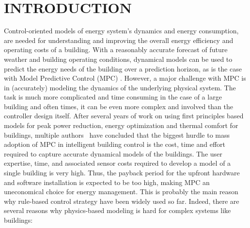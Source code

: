 \section{INTRODUCTION}

\label{S:intro}



\textcolor[rgb]{0,0,1}{Control-oriented models of energy system's dynamics and energy consumption, are needed for understanding and improving the overall energy efficiency and operating costs of a building.
With a reasonably accurate forecast of future weather and building operating conditions, dynamical models can be used to predict the energy needs of the building over a prediction horizon, as is the case with Model Predictive Control (MPC) \cite{Sturzenegger2016}.
However, a major challenge with MPC is in (accurately) modeling the dynamics of the underlying physical system.
The task is much more complicated and time consuming in the case of a large building and often times, it can be even more complex and involved than the controller design itself.
After several years of work on using first principles based models for peak power reduction, energy optimization and thermal comfort for buildings, multiple authors~\cite{Sturzenegger2016, vzavcekova2014} have concluded that the biggest hurdle to mass adoption of MPC in intelligent building control is the cost, time and effort required to capture accurate dynamical models of the buildings.
The user expertise, time, and associated sensor costs required to develop a model of a single building is very high. Thus, the payback period for the upfront hardware and software installation is expected to be too high, making MPC an uneconomical choice for energy management. This is probably the main reason why rule-based control strategy have been widely used so far. Indeed, there are several reasons why physics-based modeling is hard for complex systems like buildings:}


